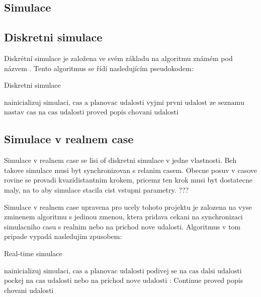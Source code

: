 \subsection{Simulace}
\subsection{Diskretni simulace}
Diskrétní simulace je založena ve svém základu na algoritmu známém pod názvem . Tento algoritmus se řídí nasledujícím pseudokodem:
\begin{algorithm}
  \caption{Diskretni simulace}\label{euclid}
  \begin{algorithmic}[1]
  \State $\text{nainicializuj simulaci, cas a planovac udalosti}$
  \State $\text{vyjmi prvni udalost ze seznamu}$
  \Return
  \EndIf
  \State $\text{nastav cas na cas udalosti}$
  \State $\text{proved popis chovani udalosti}$
  \EndWhile
  \end{algorithmic}
  \end{algorithm}
\subsection{Simulace v realnem case}
Simulace v realnem case se lisi of diskretni simulace v jedne vlastnosti. Beh takove simulace musi byt synchronizovan s relanim casem. Obecne posuv v casove rovine se provadi kvazidistantnim krokem, pricemz ten krok musi byt dostatecne maly, na to aby simulace stacila cist vstupni parametry. ??? %

Simulace v realnem case upravena pro ucely tohoto projektu je zalozena na vyse zminenem algoritmu  s jedinou zmenou, ktera pridava cekani na synchronizaci simulacniho casu s realnim nebo na prichod nove udalosti. Algoritmus v tom pripade vypadá nasledujim zpusobem:

\begin{algorithm}
\caption{Real-time simulace}\label{euclid}
\begin{algorithmic}[1]
\State $\text{nainicializuj simulaci, cas a planovac udalosti}$
\State $\text{podivej se na cas dalsi udalosti}$
\Return
\EndIf
\State $\text{pockej na cas udalosti nebo na prichod nove udalosti}$
:
    \State Continue
\EndIf
\State proved popis chovani udalosti
\EndWhile
\end{algorithmic}
\end{algorithm}

